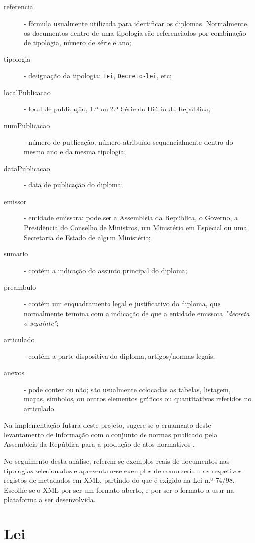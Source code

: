\begin{description}
    \item[referencia] - fórmula usualmente utilizada para identificar os diplomas. 
    Normalmente, os documentos dentro de uma tipologia 
    são referenciados por combinação de tipologia, número de série e ano;
    \item[tipologia] - designação da tipologia: \texttt{Lei}, \texttt{Decreto-lei}, etc;
    \item[localPublicacao] - local de publicação, 1.ª ou 2.ª Série do 
    Diário da República;
    \item[numPublicacao] - número de publicação, número atribuído sequencialmente 
    dentro do mesmo ano e da mesma tipologia;
    \item[dataPublicacao] - data de publicação do diploma;
    \item[emissor] - entidade emissora: pode ser a Assembleia da República, o Governo, 
    a Presidência do Conselho de Ministros, um Ministério em Especial ou uma Secretaria 
    de Estado de algum Ministério;
    \item[sumario] - contém a indicação do assunto principal do diploma;
    \item[preambulo] - contém um enquadramento legal e justificativo do diploma, 
    que normalmente termina com a indicação de que a entidade emissora \emph{"decreta o seguinte"};
    \item[articulado] - contém a parte dispositiva do diploma, artigos/normas legais;
    \item[anexos] - pode conter ou não; são usualmente colocadas as tabelas, listagem, mapas, símbolos, 
    ou outros elementos gráficos ou quantitativos referidos no articulado.
\end{description}

Na implementação futura deste projeto, sugere-se o cruamento deste levantamento de informação com o conjunto de normas 
publicado pela Assembleia da República para a produção de atos normativos \cite{GuiaLegistica2019}.

No seguimento desta análise, referem-se exemplos reais de documentos nas tipologias selecionadas e apresentam-se 
exemplos de como seriam os respetivos registos de metadados em XML, partindo do que é exigido na Lei n.º 74/98. 
Escolhe-se o XML por ser um formato aberto, e por ser o formato a usar na plataforma a ser desenvolvida.

\section{Lei}


